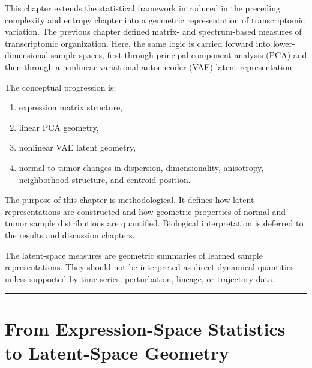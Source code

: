 \documentclass[
  letterpaper,
  DIV=11,
  numbers=noendperiod,
  openany,
  oneside]{scrreprt}
\providecommand{\tightlist}{%
  \setlength{\itemsep}{0pt}\setlength{\parskip}{0pt}}
\begin{document}
This chapter extends the statistical framework introduced in the
preceding complexity and entropy chapter into a geometric representation
of transcriptomic variation. The previous chapter defined matrix- and
spectrum-based measures of transcriptomic organization. Here, the same
logic is carried forward into lower-dimensional sample spaces, first
through principal component analysis (PCA) and then through a nonlinear
variational autoencoder (VAE) latent representation.

The conceptual progression is:

\begin{enumerate}
\def\labelenumi{\arabic{enumi}.}
\tightlist
\item
  expression matrix structure,
\item
  linear PCA geometry,
\item
  nonlinear VAE latent geometry,
\item
  normal-to-tumor changes in dispersion, dimensionality, anisotropy,
  neighborhood structure, and centroid position.
\end{enumerate}

The purpose of this chapter is methodological. It defines how latent
representations are constructed and how geometric properties of normal
and tumor sample distributions are quantified. Biological interpretation
is deferred to the results and discussion chapters.

\begin{tcolorbox}[enhanced jigsaw, opacityback=0, colframe=quarto-callout-note-color-frame, toptitle=1mm, colback=white, breakable, toprule=.15mm, bottomrule=.15mm, opacitybacktitle=0.6, title=\textcolor{quarto-callout-note-color}{\faInfo}\hspace{0.5em}{Note}, coltitle=black, rightrule=.15mm, leftrule=.75mm, left=2mm, bottomtitle=1mm, titlerule=0mm, colbacktitle=quarto-callout-note-color!10!white, arc=.35mm]

The latent-space measures are geometric summaries of learned sample
representations. They should not be interpreted as direct dynamical
quantities unless supported by time-series, perturbation, lineage, or
trajectory data.

\end{tcolorbox}

\begin{center}\rule{0.5\linewidth}{0.5pt}\end{center}

\section{From Expression-Space Statistics to Latent-Space
Geometry}\label{from-expression-space-statistics-to-latent-space-geometry}
\end{document}
